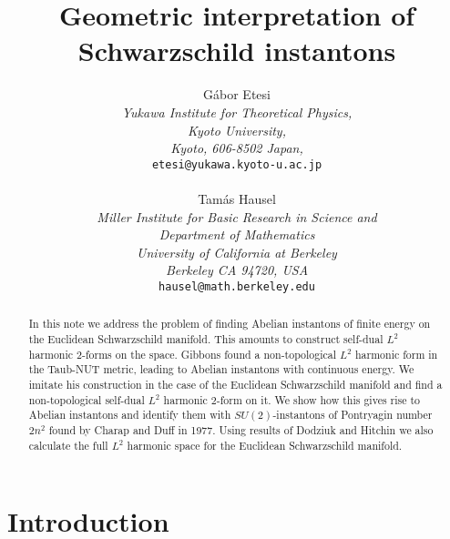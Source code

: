 \documentclass[a4paper,12pt,draft]{article}
\begin{document}
\thispagestyle{empty}

\title{Geometric interpretation of Schwarzschild instantons}

\author{ 
G\'abor Etesi
\\ {\it Yukawa Institute for Theoretical Physics,}
\\ {\it  Kyoto University,} 
\\{\it Kyoto, 606-8502 Japan,} 
\\ {\tt etesi@yukawa.kyoto-u.ac.jp}
\\
\\ Tam\'as Hausel 
\\ {\it Miller Institute for Basic Research in Science and}\\
{\it Department of Mathematics}
\\ {\it University of California at Berkeley} 
\\ {\it Berkeley CA 94720, USA}\\ 
{\tt hausel@math.berkeley.edu} }

\maketitle

\begin{abstract} In this note we address the problem of finding 
Abelian instantons of finite energy on the Euclidean Schwarzschild
manifold. This amounts to construct self-dual 
$L^2$ harmonic $2$-forms on the space. Gibbons found a non-topological $L^2$ 
harmonic form in the Taub-NUT metric, leading to Abelian instantons with 
continuous energy.
We imitate his construction in the case of the Euclidean Schwarzschild
 manifold and find a non-topological self-dual $L^2$ harmonic $2$-form on it.
 We show how this gives rise to Abelian instantons and identify them 
with $SU(2)$-instantons of Pontryagin number $2n^2$
found by Charap and Duff in 1977. Using results of Dodziuk and Hitchin we 
also calculate the full $L^2$ harmonic space for the
Euclidean Schwarzschild manifold. 
 \end{abstract}

\thispagestyle{empty}

\newpage


\section{Introduction} 
\end{document}
